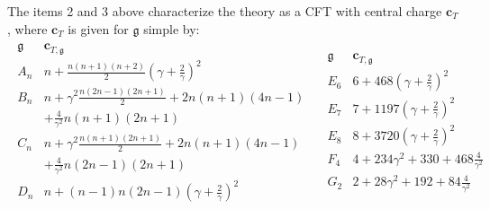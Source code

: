 \documentclass[AHL,Unicode,longabstracts,published]{cedram}
\newcommand{\frkg}{\mathfrak{g}}
\newcommand{\bfc}{\mathbf{c}}
\begin{document}
The items 2 and 3 above characterize the theory as a CFT with central charge $\bfc_T$, where $\bm c_T$ is given for $\frkg$ simple by:
\begin{multline}\label{central_charge}
\begin{array}{c|c}
\frkg & \bm c_{T,\frkg} \\
\hline A_{n}& n+\frac{n(n+1)(n+2)}2(\gamma+\frac2\gamma)^2 \\
B_n & n+ \gamma^2\frac{n(2n-1)(2n+1)}{2}+2n(n+1)(4n-1)\\
&+\frac{4}{\gamma^2}n(n+1)(2n+1)\\
C_n& n+\gamma^2\frac{n(n+1)(2n+1)}{2}+2n(n+1)(4n-1)\\
&+\frac{4}{\gamma^2}{n(2n-1)(2n+1)}\\
D_n& n+ (n-1)n(2n-1)(\gamma+\frac2\gamma)^2\\
\end{array}
\quad
\begin{array}{c|c}
\frkg & \bm c_{T,\frkg} \\
\hline E_6 & 6+468(\gamma+\frac2\gamma)^2\\
E_7 & 7+1197 (\gamma+\frac2\gamma)^2\\
E_8 & 8+3720 (\gamma+\frac2\gamma)^2\\
F_4 & 4+ 234\gamma^2+330+468\frac{4}{\gamma^2}\\
G_2 & 2+28\gamma^2+192+84\frac{4}{\gamma^2}\\
&
\end{array}
\end{multline}
\end{document}
